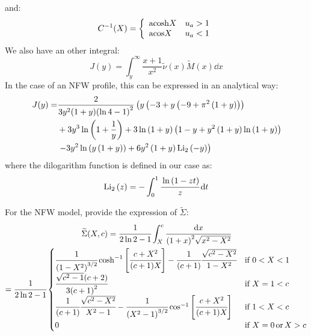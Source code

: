 %
and:
%
\begin{equation}
    C^{-1}(X)=\left\{\begin{array}{lr}
        {\rm{acosh}}{X}&u_a>1\\
        {\rm{acos}}{X}&u_a<1\\
    \end{array}\right.
\end{equation}
%
We also have an other integral:
%
\begin{equation}
    J(y)=\int_y^{\infty}\frac{x+1}{x^2}\widetilde{\nu}{(x)}\widetilde{M}{(x)}\dd{x}
\end{equation}
%
In the case of an NFW profile, this can be expressed in an analytical way:
%
\begin{align*}
    J(y)=&
        \frac{2}{3{y^2}(1+y){\left(\ln{4}-1\right)}^2}
        \left(y\left(-3+y\left(-9+\pi^2\left(1+y\right)\right)\right)\right.\\
    &+3{y^3}\ln\left(1+\frac{1}{y}\right)+3\ln\left(1+y\right)
            \left(1-y+y^2\left(1+y\right)\ln\left(1+y\right)\right)\\
    &\left.-3{y^2}\ln\left({y}\left(1+y\right)\right)+6{y^2}
        \left(1+y\right){\mathrm{Li}_2\left(-y\right)}\right)\\
\end{align*}
%
where the dilogarithm function is defined in our case as:
%
\begin{equation}
    \mathrm{Li}_2\left(z\right)=-\int_0^1\cfrac{\ln{(1-zt)}}{z}\,{\rm{d}}{t}
\end{equation}

For the NFW model, \citet{MBM+10} provide the expression of
$\widetilde{\Sigma}$:
%
\begin{multline}
    \widetilde{\Sigma}(X,c)=\cfrac{1}{2\ln2-1}\int_X^c\cfrac{{\rm{d}}{x}}{{(1+x)}^2\sqrt{x^2-X^2}}\\
    =\cfrac{1}{2\ln2-1}\begin{cases}
        \cfrac{1}{{(1-X^2)}^{3/2}}
        \cosh^{-1}\left[\cfrac{c+X^2}{(c+1)X}\right]-
        \cfrac{1}{(c+1)}\cfrac{\sqrt{c^2-X^2}}{1-X^2} &\text{if } 0<X<1 \\
    \cfrac{\sqrt{c^2-1}(c+2)}{3{(c+1)}^2} &\text{if } X=1<c\\
    \cfrac{1}{(c+1)}\cfrac{\sqrt{c^2-X^2}}{X^2-1}-
    \cfrac{1}{{(X^2-1)}^{3/2}}
    \cos^{-1}\left[\cfrac{c+X^2}{(c+1)X}\right] &\text{if } 1<X<c\\
    0 &\text{if } X=0\,\text{or}\,X>c
    \end{cases}
\end{multline}

